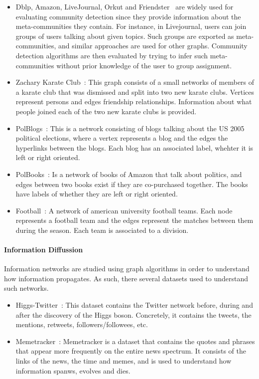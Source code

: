 \begin{itemize}
  \item Dblp, Amazon, LiveJournal, Orkut and Friendster~\cite{yang2015defining}
    are widely used for evaluating community detection since they provide
    information about the meta-communities they contain. For instance, in
    Livejournal, users can join groups of users talking about given topics. Such
    groups are exported as meta-communities, and similar approaches are used for
    other graphs. Community detection algorithms are then evaluated by trying to
    infer such meta-communities without prior knowledge of the user to group
    assignment.
  \item Zachary Karate Club~\cite{zachary1977information}: This graph consists
    of a small networks of members of a karate club that was dismissed and split
    into two new karate clubs. Vertices represent persons and edges friendship
    relationships. Information about what people joined each of the two new
    karate clubs is provided.
  \item PolBlogs~\cite{adamic2005political}: This is a network consisting of
    blogs talking about the US 2005 political elections, where a vertex
    represents a blog and the edges the hyperlinks between the blogs. Each blog
    has an associated label, whehter it is left or right oriented.
  \item PolBooks~\cite{10dimacs}: Is a network of books of Amazon that talk
    about politics, and edges between two books exist if they are co-purchased
    together. The books have labels of whether they are left or right oriented.
  \item Football~\cite{girvan2002network}: A network of american university
    football teams. Each node represents a football team and the edges represent
    the matches between them during the season. Each team is associated to a
    division.
\end{itemize}

\paragraph{Information Diffussion}

Information networks are studied using graph algorithms in order to understand
how information propagates. As such, there several datasets used to understand
such networks.

\begin{itemize}
  \item Higgs-Twitter~\cite{de2013anatomy}: This dataset contains the Twitter
    network before, during and after the discovery of the Higgs boson.
    Concretely, it contains the tweets, the mentions, retweets,
    followers/followees, etc.  
  \item Memetracker~\cite{leskovec2009memede2013}: Memetracker is a dataset that
    contains the quotes and phrases that appear more frequently on the entire
    news spectrum. It consists of the links of the news, the time and memes, and
    is used to understand how information spanws, evolves and dies.
\end{itemize}

